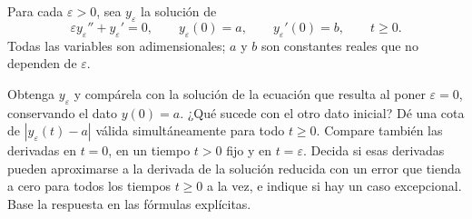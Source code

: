 Para cada \(\varepsilon>0\), sea \(y_\varepsilon\) la solución de
\[
\varepsilon y_\varepsilon''+y_\varepsilon'=0,
\qquad y_\varepsilon(0)=a,\qquad y_\varepsilon'(0)=b,
\qquad t\ge0.
\]
Todas las variables son adimensionales; \(a\) y \(b\) son constantes reales que no dependen de \(\varepsilon\).

Obtenga \(y_\varepsilon\) y compárela con la solución de la ecuación que resulta al poner \(\varepsilon=0\), conservando el dato \(y(0)=a\). ¿Qué sucede con el otro dato inicial? Dé una cota de \(|y_\varepsilon(t)-a|\) válida simultáneamente para todo \(t\ge0\). Compare también las derivadas en \(t=0\), en un tiempo \(t>0\) fijo y en \(t=\varepsilon\). Decida si esas derivadas pueden aproximarse a la derivada de la solución reducida con un error que tienda a cero para todos los tiempos \(t\ge0\) a la vez, e indique si hay un caso excepcional. Base la respuesta en las fórmulas explícitas.
